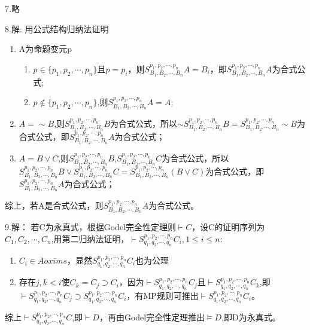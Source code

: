 \documentclass[a4paper]{ctexart}
\begin{document}
\noindent 7.略

\noindent 8.解:
用公式结构归纳法证明
\begin{enumerate}
  \item A为命题变元p
  \begin{enumerate}
    \item $p\in\{p_1,p_2,\cdots,p_n\}$且$p=p_i$，则$S^{p_1,p_2,\cdots,p_n}_{B_1,B_2,\cdots,B_n}A=B_i$，即$S^{p_1,p_2,\cdots,p_n}_{B_1,B_2,\cdots,B_n}A$为合式公式;
    \item $p\not\in\{p_1,p_2,\cdots,p_n\}$,则$S^{p_1,p_2,\cdots,p_n}_{B_1,B_2,\cdots,B_n}A=A$;
  \end{enumerate}
  \item $A=\sim B$,则$S^{p_1,p_2,\cdots,p_n}_{B_1,B_2,\cdots,B_n}B$为合式公式，所以$\sim S^{p_1,p_2,\cdots,p_n}_{B_1,B_2,\cdots,B_n}B=S^{p_1,p_2,\cdots,p_n}_{B_1,B_2,\cdots,B_n}\sim B$为合式公式，即$S^{p_1,p_2,\cdots,p_n}_{B_1,B_2,\cdots,B_n}A$为合式公式；
  \item $A=B\vee C$,则$S^{p_1,p_2,\cdots,p_n}_{B_1,B_2,\cdots,B_n}B$,$S^{p_1,p_2,\cdots,p_n}_{B_1,B_2,\cdots,B_n}C$为合式公式，所以$S^{p_1,p_2,\cdots,p_n}_{B_1,B_2,\cdots,B_n}B \vee S^{p_1,p_2,\cdots,p_n}_{B_1,B_2,\cdots,B_n}C=S^{p_1,p_2,\cdots,p_n}_{B_1,B_2,\cdots,B_n}(B\vee C)$为合式公式，即$S^{p_1,p_2,\cdots,p_n}_{B_1,B_2,\cdots,B_n}A$为合式公式；
\end{enumerate}
综上，若A是合式公式，则$S^{p_1,p_2,\cdots,p_n}_{B_1,B_2,\cdots,B_n}A$为合式公式。\newline

\noindent 9.解：
若C为永真式，根据Godel完全性定理则$\vdash C$，设C的证明序列为$C_1,C_2,\cdots,C_n$,用第二归纳法证明，$\vdash S^{p_1,p_2,\cdots,p_n}_{q_1,q_2,\cdots,q_n}C_i,1\leq i\leq n$:
\begin{enumerate}
  \item $C_i\in Aoxims$，显然$S^{p_1,p_2,\cdots,p_n}_{q_1,q_2,\cdots,q_n}C_i$也为公理
  \item 存在$j,k<i$使$C_k=C_j\supset C_i$，因为$\vdash S^{p_1,p_2,\cdots,p_n}_{q_1,q_2,\cdots,q_n}C_j$且$\vdash S^{p_1,p_2,\cdots,p_n}_{q_1,q_2,\cdots,q_n}C_k$,即$\vdash S^{p_1,p_2,\cdots,p_n}_{q_1,q_2,\cdots,q_n}C_j\supset S^{p_1,p_2,\cdots,p_n}_{q_1,q_2,\cdots,q_n}C_i$，有MP规则可推出$\vdash S^{p_1,p_2,\cdots,p_n}_{q_1,q_2,\cdots,q_n}C_i$。
\end{enumerate}
综上$\vdash S^{p_1,p_2,\cdots,p_n}_{q_1,q_2,\cdots,q_n}C$,即$\vdash D$，再由Godel完全性定理推出$\models D$,即D为永真式。\newline
\end{document}
